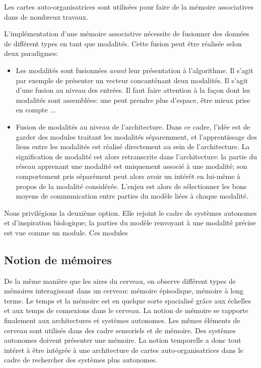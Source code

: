 Les cartes auto-organisatrices sont utilisées pour faire de la mémoire associatives dans de nombreux travaux. 


L'implémentation d'une mémoire associative nécessite de fusionner des données de différent types en tant que modalités. Cette fusion peut être réalisée selon deux paradigmes:
\begin{itemize}
\item Les modalités sont fusionnées \emph{avant} leur présentation à l'algorithme. Il s'agit par exemple de présenter un vecteur concanténant deux modalités. Il s'agit d'une fusion au niveau des entrées.
Il faut faire attention à la façon dont les modalités sont assemblées: une peut prendre plus d'espace, être mieux prise en compte ...
\item Fusion de modalités au niveau de l'architecture. Dans ce cadre, l'idée est de garder des modules traitant les modalités séparemment, et l'apprentissage des liens entre les modalités est réalisé directement au sein de l'architecture. La signification de modalité est alors retranscrite dans l'architecture: la partie du réseau apprenant une modalité est uniquement associé à une modalité; son comportement pris séparément peut alors avoir un intérêt en lui-même à propos de la modalité considérée.
L'enjeu est alors de sélectionner les bons moyens de communication entre parties du modèle liées à chaque modalité.
\end{itemize}

Nous privilégions la deuxième option. Elle rejoint le cadre de systèmes autonomes et d'inspiration biologique; la parties du modèle renvoyant à une modalité précise est vue comme un module. Ces modules 


\subsection{Notion de mémoires}

De la même manière que les aires du cerveau, on observe différent types de mémoires interagissant dans un cerveau: mémoire épisodique, mémoire à long terme. Le temps et la mémoire est en quelque sorte spacialisé grâce aux échelles et aux temps de connexions dans le cerveau. 
La notion de mémoire se rapporte finalement aux architectures et systèmes autonomes. Les mêmes éléments de cerveau sont utilisés dans des cadre sensoriels et de mémoire. 
Des systèmes autonomes doivent présenter une mémoire. 
La notion temporelle a donc tout intéret à être intégrée à une architecture de cartes auto-organisatrices dans le cadre de rechercher des systèmes plus autonomes.

